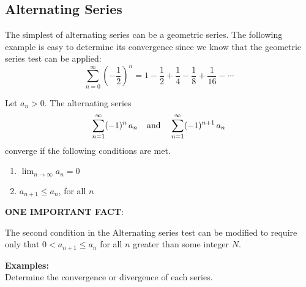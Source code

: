 \subsection*{Alternating Series}
The simplest of alternating series can be a geometric series. The following example is easy to determine its convergence since we know that the geometric series test can be applied:
\[\sum_{n=0}^{\infty}\left(-\frac{1}{2}\right)^n=1-\frac{1}{2}+\frac{1}{4}-\frac{1}{8}+\frac{1}{16}-\cdots\]

\vspace{.07in}

\begin{tcolorbox}[title= THE ALTERNATING SERIES TEST,colframe=black,sharp corners,colback=white,colbacktitle=white,coltitle=black]

    Let $a_n>0$. The alternating series
    \[\sum_{n=1}^\infty(-1)^n\, a_n\hspace{.15in}\text{and}\hspace{.15in}\sum_{n=1}^\infty(-1)^{n+1}\,a_n\]
    converge if the following conditions are met.\\
    \begin{enumerate}
        \item $\displaystyle\lim_{n\to\infty}a_n=0$
        \item $\displaystyle a_{n+1}\le a_n$, for all $n$
    \end{enumerate}

\end{tcolorbox}
\vspace{.1in}
\noindent\textbf{ONE IMPORTANT FACT}:
\begin{questions}
    \question The second condition in the Alternating series test can be modified to require only that $0<a_{n+1}\le a_n$ for all $n$ greater than some integer $N$.
\end{questions}
\vspace{.1in}

\noindent\textbf{Examples:}\\
Determine the convergence or divergence of each series.


